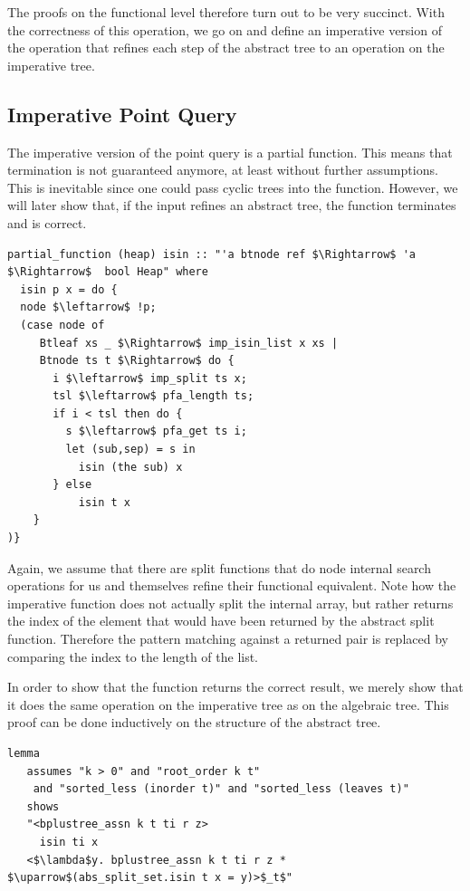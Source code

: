 \documentclass[a4paper,UKenglish,cleveref, autoref, thm-restate]{lipics-v2021}
\begin{document}
The proofs on the functional level therefore turn out to be very succinct.
With the correctness of this operation,
we go on and define an imperative version of the operation that
refines each step of the abstract tree to an operation on the imperative tree.

\subsection{Imperative Point Query}
\label{sec:imperative_pq}

The imperative version of the point query is a partial function.
This means that termination is not guaranteed anymore,
at least without further assumptions.
This is inevitable since one could pass cyclic trees into the function.
However, we will later show that, if the input refines an abstract tree,
the function terminates and is correct.

\begin{lstlisting}[mathescape=true, language=Isabelle,label=lst:isin-imp-def]
partial_function (heap) isin :: "'a btnode ref $\Rightarrow$ 'a $\Rightarrow$  bool Heap" where
  isin p x = do {
  node $\leftarrow$ !p;
  (case node of
     Btleaf xs _ $\Rightarrow$ imp_isin_list x xs |
     Btnode ts t $\Rightarrow$ do {
       i $\leftarrow$ imp_split ts x;
       tsl $\leftarrow$ pfa_length ts;
       if i < tsl then do {
         s $\leftarrow$ pfa_get ts i;
         let (sub,sep) = s in
           isin (the sub) x
       } else
           isin t x
    }
)}
\end{lstlisting}

Again, we assume that there are split functions that do node internal search operations for us
and themselves refine their functional equivalent.
Note how the imperative function does not actually split
the internal array, but rather returns the index of the element
that would have been returned by the abstract split function.
Therefore the pattern matching against a returned pair
is replaced by comparing the index to the length of the list.

In order to show that the function returns the correct result,
we merely show that it does the same operation on the imperative tree
as on the algebraic tree.
This proof can be done inductively on the structure of the abstract tree.

\begin{lstlisting}[mathescape=true, language=Isabelle,label=lst:isin-refines]
lemma  
   assumes "k > 0" and "root_order k t"
    and "sorted_less (inorder t)" and "sorted_less (leaves t)"
   shows
   "<bplustree_assn k t ti r z>
     isin ti x
   <$\lambda$y. bplustree_assn k t ti r z * $\uparrow$(abs_split_set.isin t x = y)>$_t$"
\end{lstlisting}
\end{document}
